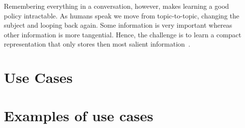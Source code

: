 \documentclass[letterpaper, 10 pt]{IEEEconf}
\begin{document}
Remembering everything in a conversation, however, makes learning a
good policy intractable. As humans speak we move from topic-to-topic,
changing the subject and looping back again. Some information is very
important whereas other information is more tangential. Hence, the
challenge is to learn a compact representation that only stores then
most salient information~\cite{microsoft_research_2018}.

\section{Use Cases}


\section{Examples of use cases}


\addtolength{\textheight}{-12cm}   %



\end{document}
